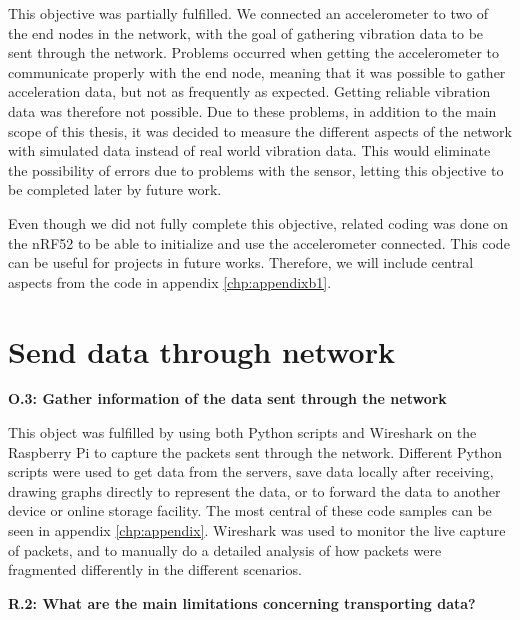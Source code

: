 \noindent This objective was partially fulfilled. We connected an accelerometer to two of the end nodes in the network, with the goal of gathering vibration data to be sent through the network. Problems occurred when getting the accelerometer to communicate properly with the end node, meaning that it was possible to gather acceleration data, but not as frequently as expected. Getting reliable vibration data was therefore not possible. Due to these problems, in addition to the main scope of this thesis, it was decided to measure the different aspects of the network with simulated data instead of real world vibration data. This would eliminate the possibility of errors due to problems with the sensor, letting this objective to be completed later by future work. 

\noindent Even though we did not fully complete this objective, related coding was done on the \gls{nRF52} to be able to initialize and use the accelerometer connected. This code can be useful for projects in future works. Therefore, we will include central aspects from the code in appendix \ref{chp:appendixb1}.  



\section{Send data through network}

\noindent\textbf{O.3: Gather information of the data sent through the network}

\noindent This object was fulfilled by using both Python scripts and Wireshark on the \gls{Raspberry Pi} to capture the packets sent through the network. Different Python scripts were used to get data from the servers, save data locally after receiving, drawing graphs directly to represent the data, or to forward the data to another device or online storage facility. The most central of these code samples can be seen in appendix \ref{chp:appendix}. Wireshark was used to monitor the live capture of packets, and to manually do a detailed analysis of how packets were fragmented differently in the different scenarios. 

\noindent\textbf{R.2: What are the main limitations concerning transporting data?} 

